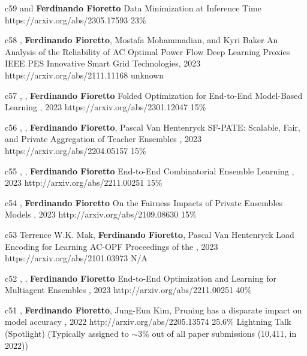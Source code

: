 \begin{pubs}

\confentry
	{c59}
	{ and {\bf Ferdinando Fioretto}}
	{Data Minimization at Inference Time}
	{\procNeurIPS}
	{https://arxiv.org/abs/2305.17593}
	{23\%}

\confentry
	{c58}
	{, {\bf Ferdinando Fioretto}, Mostafa Mohammadian, and Kyri Baker}
	{An Analysis of the Reliability of AC Optimal Power Flow Deep Learning Proxies}
	{IEEE PES Innovative Smart Grid Technologies, 2023}
	{https://arxiv.org/abs/2111.11168}
	{unknown}

\confentry 
	{c57} %
	{, , {\bf Ferdinando Fioretto}}
	{Folded Optimization for End-to-End Model-Based Learning}
	{\procIJCAI, 2023}
	{https://arxiv.org/abs/2301.12047}
	{15\%}

\confentry
    {c56} %
	{, , {\bf Ferdinando Fioretto}, Pascal Van Hentenryck}
	{SF-PATE: Scalable, Fair, and Private Aggregation of Teacher Ensembles}
    {\procIJCAI, 2023}
	{https://arxiv.org/abs/2204.05157}
    {15\%}

\confentry
    {c55} %
	{, , {\bf Ferdinando Fioretto}}
	{End-to-End Combinatorial Ensemble Learning}
    {\procIJCAI, 2023}
	{http://arxiv.org/abs/2211.00251}
    {15\%}

\confentry
    {c54} %
	{, {\bf Ferdinando Fioretto}}
	{On the Fairness Impacts of Private Ensembles Models}
    {\procIJCAI, 2023}
	{http://arxiv.org/abs/2109.08630}
    {15\%}

\confentry
	{c53} %
	{Terrence W.K. Mak, {\bf Ferdinando Fioretto}, Pascal Van Hentenryck}
	{Load Encoding for Learning AC-OPF}
	{Proceedings of the , 2023}
	{https://arxiv.org/abs/2101.03973}
	{N/A}

\confentry
    {c52} %
	{, , {\bf Ferdinando Fioretto}}
	{End-to-End Optimization and Learning for Multiagent Ensembles}
    {\procAAMAS, 2023}
	{http://arxiv.org/abs/2211.00251}
    {40\%}

\confentryAwd
	{c51} %
	{, {\bf Ferdinando Fioretto}, Jung-Eun Kim, 
	}
	{Pruning has a disparate impact on model accuracy}
	{\procNeurIPS, 2022}
	{http://arxiv.org/abs/2205.13574}
	{25.6\%} %
	{Lightning Talk (Spotlight)}
	{(Typically assigned to $\sim$3\% out of all paper submissions (10,411, in 2022))}


\end{pubs}
